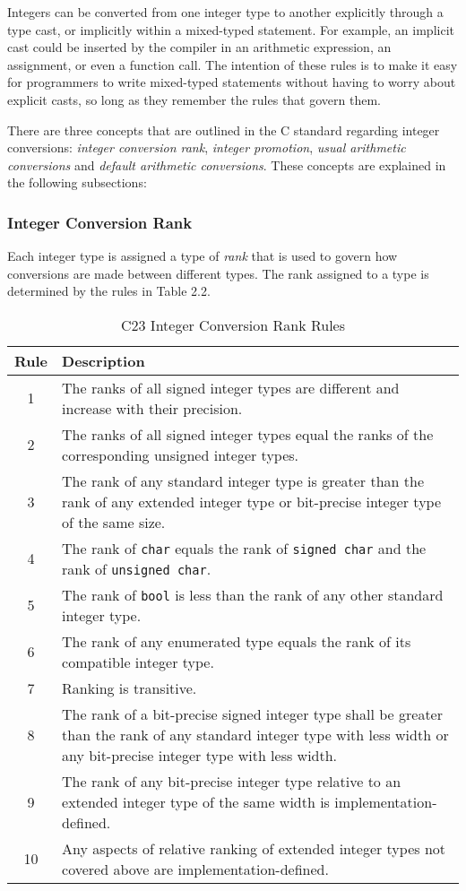 Integers can be converted from one integer type to another explicitly through a type cast, or implicitly within a mixed-typed statement. For example, an implicit cast could be inserted by the compiler in an arithmetic expression, an assignment, or even a function call. The intention of these rules is to make it easy for programmers to write mixed-typed statements without having to worry about explicit casts, so long as they remember the rules that govern them.

There are three concepts that are outlined in the C standard regarding integer conversions: \textit{integer conversion rank}, \textit{integer promotion}, \textit{usual arithmetic conversions} and \textit{default arithmetic conversions}. These concepts are explained in the following subsections:

\subsubsection{Integer Conversion Rank}

Each integer type is assigned a type of \textit{rank} that is used to govern how conversions are made between different types. The rank assigned to a type is determined by the rules in Table 2.2.

\begin{table}[h!]
\centering
\begin{tabular}{|c|p{13cm}|}
\hline
\textbf{Rule} & \textbf{Description} \\
\hline
1 & The ranks of all signed integer types are different and increase with their precision.\\
\hline
2 & The ranks of all signed integer types equal the ranks of the corresponding unsigned integer types. \\
\hline
3 & The rank of any standard integer type is greater than the rank of any extended integer type or bit-precise integer type of the same size.\\
\hline
4 & The rank of \texttt{char} equals the rank of \texttt{signed char} and the rank of \texttt{unsigned char}. \\
\hline
5 & The rank of \texttt{bool} is less than the rank of any other standard integer type. \\
\hline
6 & The rank of any enumerated type equals the rank of its compatible integer type. \\
\hline
7 & Ranking is transitive.\\
\hline
8 & The rank of a bit-precise signed integer type shall be greater than the rank of any standard integer type with less width or any bit-precise integer type with less width. \\
\hline
9 & The rank of any bit-precise integer type relative to an extended integer type of the same width is implementation-defined. \\
\hline
10 & Any aspects of relative ranking of extended integer types not covered above are implementation-defined. \\
\hline
\end{tabular}
\caption{C23 Integer Conversion Rank Rules}
\end{table}


